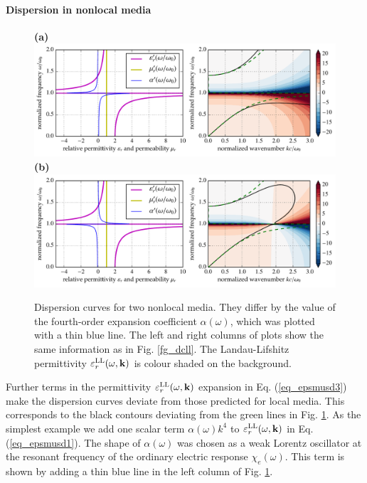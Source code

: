 \paragraph{Dispersion in nonlocal media} %
\begin{figure}[t] \caption{Dispersion curves for two nonlocal media. They differ by the value of the fourth-order expansion coefficient $\alpha(\omega)$, which was plotted with a thin blue line. The left and right columns of plots show the same information as in Fig. \ref{fg_dcll}. The Landau-Lifshitz permittivity $\varepsilon_r^\text{LL}(\omega,{\mathbf{k}})$ is colour shaded on the background.  } \label{fg_dcll_nl} \centering  
\textbf{(a)}\\	\includegraphics[width=1\textwidth]{img/dispersion_landau_lifshitz/dispersion_ll_quadrupp.pdf}
\textbf{(b)}\\	\includegraphics[width=1\textwidth]{img/dispersion_landau_lifshitz/dispersion_ll_quadrupn.pdf}
\end{figure}
Further terms in the permittivity $\varepsilon_r^\text{LL}(\omega,{\mathbf{k}})$ expansion in Eq. (\ref{eq_epsmusd3}) make the dispersion curves deviate from those predicted for local media. This corresponds to the black contours deviating from the green lines in Fig. \ref{fg_dcll_nl}.
As the simplest example we add one scalar term $\alpha(\omega) k^4$ to $\varepsilon_r^\text{LL}(\omega,{\mathbf{k}})$ in Eq. (\ref{eq_epsmusd1}). The shape of $\alpha(\omega)$  was chosen as a weak Lorentz oscillator at the resonant frequency of the ordinary electric response $\chi_e(\omega)$. This term is shown by adding a thin blue line in the left column of Fig. \ref{fg_dcll_nl}.

